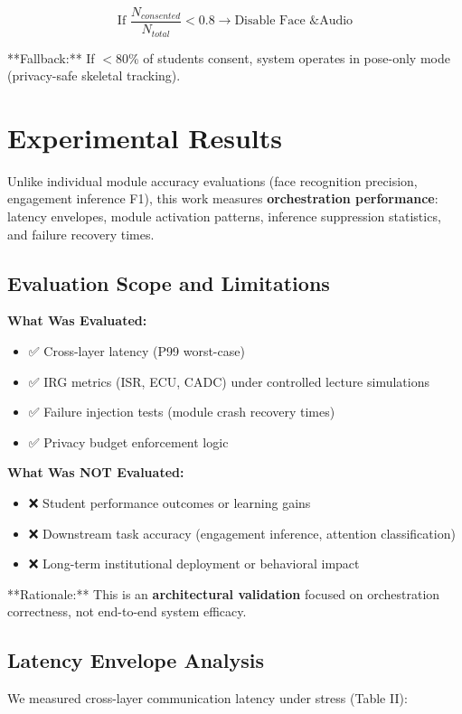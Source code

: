 \documentclass[conference]{IEEEtran}
\begin{document}
\begin{equation}
\text{If } \frac{N_{consented}}{N_{total}} < 0.8 \to \text{Disable Face \& Audio}
\end{equation}

**Fallback:** If $<$80\% of students consent, system operates in pose-only mode (privacy-safe skeletal tracking).

\section{Experimental Results}

Unlike individual module accuracy evaluations (face recognition precision, engagement inference F1), this work measures \textbf{orchestration performance}: latency envelopes, module activation patterns, inference suppression statistics, and failure recovery times.

\subsection{Evaluation Scope and Limitations}

\textbf{What Was Evaluated:}
\begin{itemize}
    \item ✅ Cross-layer latency (P99 worst-case)
    \item ✅ IRG metrics (ISR, ECU, CADC) under controlled lecture simulations
    \item ✅ Failure injection tests (module crash recovery times)
    \item ✅ Privacy budget enforcement logic
\end{itemize}

\textbf{What Was NOT Evaluated:}
\begin{itemize}
    \item ❌ Student performance outcomes or learning gains
    \item ❌ Downstream task accuracy (engagement inference, attention classification)
    \item ❌ Long-term institutional deployment or behavioral impact
\end{itemize}

**Rationale:** This is an \textbf{architectural validation} focused on orchestration correctness, not end-to-end system efficacy.

\subsection{Latency Envelope Analysis}
We measured cross-layer communication latency under stress (Table II):
\end{document}
